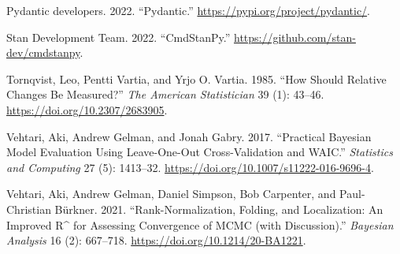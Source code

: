 \documentclass[
  letterpaper,
  DIV=11,
  numbers=noendperiod,
  oneside]{scrartcl}
\newlength{\cslhangindent}
\newenvironment{CSLReferences}[2] %
 {\begin{list}{}{%
  \setlength{\itemindent}{0pt}
  \setlength{\leftmargin}{0pt}
  \setlength{\parsep}{0pt}
  \ifodd #1
   \setlength{\leftmargin}{\cslhangindent}
   \setlength{\itemindent}{-1\cslhangindent}
  \fi
  \setlength{\itemsep}{#2\baselineskip}}}
 {\end{list}}
\theoremstyle{plain}
\theoremstyle{remark}
\begin{document}
\begin{CSLReferences}{1}{0}
Pydantic developers. 2022. {``Pydantic.''}
\url{https://pypi.org/project/pydantic/}.

Stan Development Team. 2022. {``{CmdStanPy}.''}
\url{https://github.com/stan-dev/cmdstanpy}.

Tornqvist, Leo, Pentti Vartia, and Yrjo O. Vartia. 1985. {``How {Should
Relative Changes Be Measured}?''} \emph{The American Statistician} 39
(1): 43--46. \url{https://doi.org/10.2307/2683905}.

Vehtari, Aki, Andrew Gelman, and Jonah Gabry. 2017. {``Practical
{Bayesian} Model Evaluation Using Leave-One-Out Cross-Validation and
{WAIC}.''} \emph{Statistics and Computing} 27 (5): 1413--32.
\url{https://doi.org/10.1007/s11222-016-9696-4}.

Vehtari, Aki, Andrew Gelman, Daniel Simpson, Bob Carpenter, and
Paul-Christian Bürkner. 2021. {``Rank-{Normalization}, {Folding}, and
{Localization}: {An Improved R\^{}} for {Assessing Convergence} of
{MCMC} (with {Discussion}).''} \emph{Bayesian Analysis} 16 (2):
667--718. \url{https://doi.org/10.1214/20-BA1221}.

\end{CSLReferences}
\end{document}
